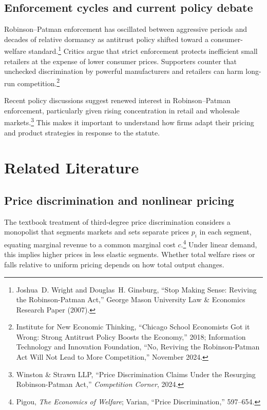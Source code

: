 \documentclass[12pt]{article}
\theoremstyle{definition}
\begin{document}
\subsection{Enforcement cycles and current policy debate}

Robinson--Patman enforcement has oscillated between aggressive periods and decades of relative dormancy as antitrust policy shifted toward a consumer-welfare standard.\footnote{Joshua~D. Wright and Douglas~H. Ginsburg, ``Stop Making Sense: Reviving the Robinson-Patman Act,'' George Mason University Law \& Economics Research Paper (2007).}
Critics argue that strict enforcement protects inefficient small retailers at the expense of lower consumer prices. Supporters counter that unchecked discrimination by powerful manufacturers and retailers can harm long-run competition.\footnote{Institute for New Economic Thinking, ``Chicago School Economists Got it Wrong: Strong Antitrust Policy Boosts the Economy,'' 2018; Information Technology and Innovation Foundation, ``No, Reviving the Robinson-Patman Act Will Not Lead to More Competition,'' November 2024.}

Recent policy discussions suggest renewed interest in Robinson--Patman enforcement, particularly given rising concentration in retail and wholesale markets.\footnote{Winston \& Strawn LLP, ``Price Discrimination Claims Under the Resurging Robinson-Patman Act,'' \textit{Competition Corner}, 2024.}
This makes it important to understand how firms adapt their pricing and product strategies in response to the statute.


\section{Related Literature}\label{sec:literature}

\subsection{Price discrimination and nonlinear pricing}

The textbook treatment of third-degree price discrimination considers a monopolist that segments markets and sets separate prices $p_i$ in each segment, equating marginal revenue to a common marginal cost $c$.\footnote{Pigou, \textit{The Economics of Welfare}; Varian, ``Price Discrimination,'' 597--654.}
Under linear demand, this implies higher prices in less elastic segments. Whether total welfare rises or falls relative to uniform pricing depends on how total output changes.
\end{document}
